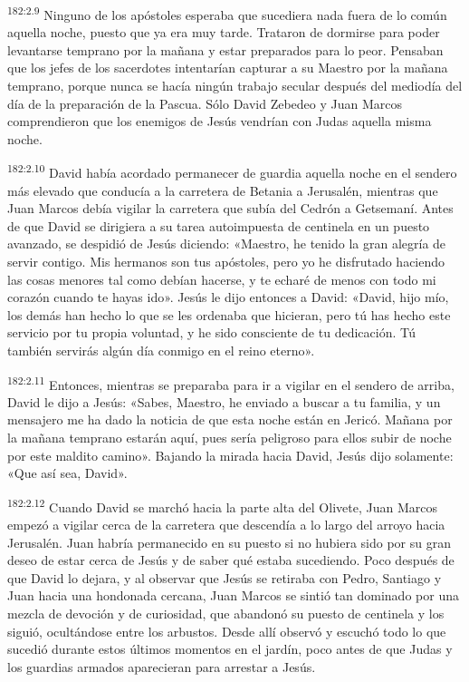 \par 
\textsuperscript{182:2.9} Ninguno de los apóstoles esperaba que sucediera nada fuera de lo común aquella noche, puesto que ya era muy tarde. Trataron de dormirse para poder levantarse temprano por la mañana y estar preparados para lo peor. Pensaban que los jefes de los sacerdotes intentarían capturar a su Maestro por la mañana temprano, porque nunca se hacía ningún trabajo secular después del mediodía del día de la preparación de la Pascua. Sólo David Zebedeo y Juan Marcos comprendieron que los enemigos de Jesús vendrían con Judas aquella misma noche.

\par 
\textsuperscript{182:2.10} David había acordado permanecer de guardia aquella noche en el sendero más elevado que conducía a la carretera de Betania a Jerusalén, mientras que Juan Marcos debía vigilar la carretera que subía del Cedrón a Getsemaní. Antes de que David se dirigiera a su tarea autoimpuesta de centinela en un puesto avanzado, se despidió de Jesús diciendo: «Maestro, he tenido la gran alegría de servir contigo. Mis hermanos son tus apóstoles, pero yo he disfrutado haciendo las cosas menores tal como debían hacerse, y te echaré de menos con todo mi corazón cuando te hayas ido». Jesús le dijo entonces a David: «David, hijo mío, los demás han hecho lo que se les ordenaba que hicieran, pero tú has hecho este servicio por tu propia voluntad, y he sido consciente de tu dedicación. Tú también servirás algún día conmigo en el reino eterno».

\par 
\textsuperscript{182:2.11} Entonces, mientras se preparaba para ir a vigilar en el sendero de arriba, David le dijo a Jesús: «Sabes, Maestro, he enviado a buscar a tu familia, y un mensajero me ha dado la noticia de que esta noche están en Jericó. Mañana por la mañana temprano estarán aquí, pues sería peligroso para ellos subir de noche por este maldito camino». Bajando la mirada hacia David, Jesús dijo solamente: «Que así sea, David».

\par 
\textsuperscript{182:2.12} Cuando David se marchó hacia la parte alta del Olivete, Juan Marcos empezó a vigilar cerca de la carretera que descendía a lo largo del arroyo hacia Jerusalén. Juan habría permanecido en su puesto si no hubiera sido por su gran deseo de estar cerca de Jesús y de saber qué estaba sucediendo. Poco después de que David lo dejara, y al observar que Jesús se retiraba con Pedro, Santiago y Juan hacia una hondonada cercana, Juan Marcos se sintió tan dominado por una mezcla de devoción y de curiosidad, que abandonó su puesto de centinela y los siguió, ocultándose entre los arbustos. Desde allí observó y escuchó todo lo que sucedió durante estos últimos momentos en el jardín, poco antes de que Judas y los guardias armados aparecieran para arrestar a Jesús.

